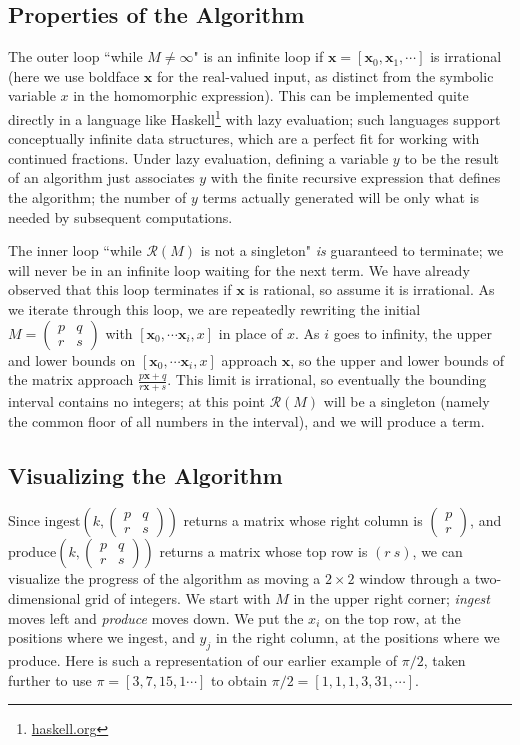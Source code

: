 \documentclass[11pt, oneside]{amsart}   	%
\newcommand{\pqrs}{\left(
\begin{smallmatrix} 
p & q\\ 
r & s 
\end{smallmatrix}
\right)}
\begin{document}
\subsection{Properties of the Algorithm}
The outer loop ``while $M \neq \infty$" is an infinite loop if $\mathbf{x} = [\mathbf{x}_0, \mathbf{x}_1,\cdots]$ is irrational (here we use boldface $\mathbf{x}$ for the real-valued input, as distinct from the symbolic variable $x$ in the homomorphic expression). This can be implemented quite directly in a language like Haskell\footnote{\href{https://haskell.org}{haskell.org}} with lazy evaluation; such languages support conceptually infinite data structures, which are a perfect fit for working with continued fractions. Under lazy evaluation, defining a variable $y$ to be the result of an algorithm just associates $y$ with the finite recursive expression that defines the algorithm; the number of $y$ terms actually generated will be only what is needed by subsequent computations.

The inner loop ``while $\mathcal{R}(M)$ is not a singleton" \emph{is} guaranteed to terminate; we will never be in an infinite loop waiting for the next term. We have already observed that this loop terminates if $\mathbf{x}$ is rational, so assume it is irrational. As we iterate through this loop, we are repeatedly rewriting the initial $M = \pqrs$
with $[\mathbf{x}_0, \cdots \mathbf{x}_i, x]$ in place of $x$. As $i$ goes to infinity, the upper and lower bounds on $[\mathbf{x}_0, \cdots \mathbf{x}_i, x]$ approach $\mathbf{x}$, so the upper and lower bounds of the matrix approach $\frac{p\mathbf{x}+q}{r\mathbf{x}+s}$. This limit is irrational, so eventually the bounding interval contains no integers; at this point $\mathcal{R}(M)$  will be a singleton (namely the common floor of all numbers in the interval), and we will produce a term.


\subsection{Visualizing the Algorithm}
Since $\mbox{ingest}(k,\pqrs)$ returns a matrix whose right column is
$\left( \begin{smallmatrix} p \\  r \end{smallmatrix}\right)$,
and $\mbox{produce}(k,\pqrs)$ returns a matrix whose top row is $(r\ s)$, we can visualize the progress of the algorithm as moving a $2 \times 2$ window through a two-dimensional grid of integers.
We start with $M$ in the upper right corner; \emph{ingest} moves left and \emph{produce} moves down. We put the $x_i$ on the top row,
at the positions where we ingest, and $y_j$ in the right column, at the positions where we produce. Here is such a representation
of our earlier example of $\pi/2$, taken further to use $\pi = [3,7,15, 1\cdots]$ to obtain $\pi/2 = [1,1,1,3,31,\cdots]$.
\end{document}
